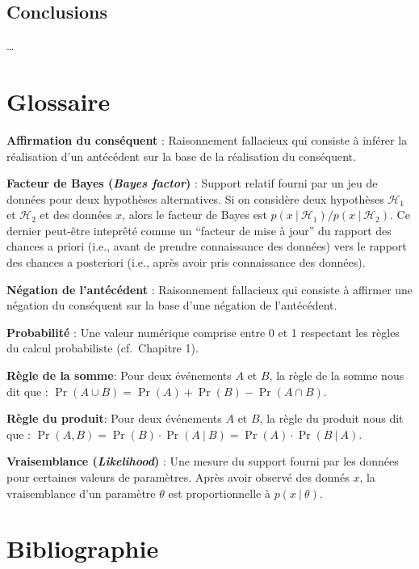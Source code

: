 \documentclass[
  a4paper,11pt,twoside,onecolumn,openright,final,oldfontcommands]{memoir}
\theoremstyle{definition}
\theoremstyle{definition}
\theoremstyle{definition}
\theoremstyle{definition}
\theoremstyle{remark}
\begin{document}
\hypertarget{conclusions}{%
\section{Conclusions}\label{conclusions}}

\ldots{}

\hypertarget{appendix-annexes}{%
\appendix}


\hypertarget{glossaire}{%
\chapter{Glossaire}\label{glossaire}}

\textbf{Affirmation du conséquent} : Raisonnement fallacieux qui consiste à inférer la réalisation d'un antécédent sur la base de la réalisation du conséquent.

\textbf{Facteur de Bayes (\emph{Bayes factor})} : Support relatif fourni par un jeu de données pour deux hypothèses alternatives. Si on considère deux hypothèses \(\mathcal{H}_{1}\) et \(\mathcal{H}_{2}\) et des données \(x\), alors le facteur de Bayes est \(p(x \ | \ \mathcal{H}_{1}) / p(x \ | \ \mathcal{H}_{2})\). Ce dernier peut-être inteprêté comme un ``facteur de mise à jour'' du rapport des chances a priori (i.e., avant de prendre connaissance des données) vers le rapport des chances a posteriori (i.e., après avoir pris connaissance des données).

\textbf{Négation de l'antécédent} : Raisonnement fallacieux qui consiste à affirmer une négation du conséquent sur la base d'une négation de l'antécédent.

\textbf{Probabilité} : Une valeur numérique comprise entre 0 et 1 respectant les règles du calcul probabiliste (cf.~Chapitre 1).

\textbf{Règle de la somme}: Pour deux événements \(A\) et \(B\), la règle de la somme nous dit que : \(\Pr(A \cup B) = \Pr(A) + \Pr(B) - \Pr(A \cap B)\).

\textbf{Règle du produit}: Pour deux événements \(A\) et \(B\), la règle du produit nous dit que : \(\Pr(A, B) = \Pr(B) \cdot \Pr(A \ | \ B) = \Pr(A) \cdot \Pr(B \ | \ A)\).

\textbf{Vraisemblance (\emph{Likelihood})} : Une mesure du support fourni par les données pour certaines valeurs de paramètres. Après avoir observé des donnés \(x\), la vraisemblance d'un paramètre \(\theta\) est proportionnelle à \(p(x \ | \ \theta)\).

\hypertarget{bibliographie}{%
\chapter*{Bibliographie}\label{bibliographie}}
\end{document}
